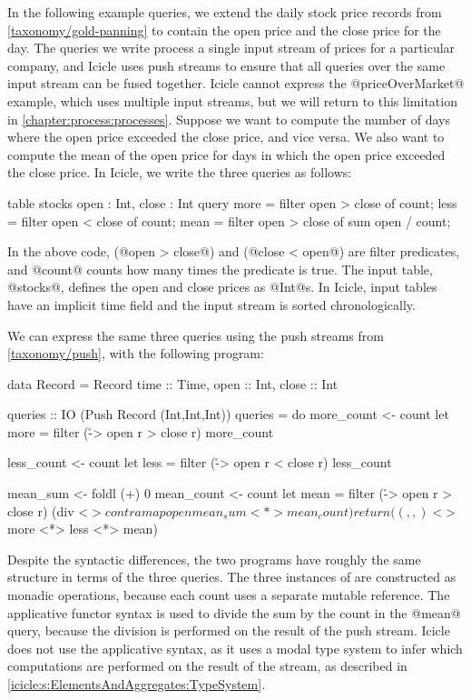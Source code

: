 In the following example queries, we extend the daily stock price records from \cref{taxonomy/gold-panning} to contain the open price and the close price for the day.
The queries we write process a single input stream of prices for a particular company, and Icicle uses push streams to ensure that all queries over the same input stream can be fused together.
Icicle cannot express the @priceOverMarket@ example, which uses multiple input streams, but we will return to this limitation in \cref{chapter:process:processes}.
Suppose we want to compute the number of days where the open price exceeded the close price, and vice versa.
We also want to compute the mean of the open price for days in which the open price exceeded the close price.
In Icicle, we write the three queries as follows:

\begin{icicle}
table stocks { open : Int, close : Int }
query 
  more = filter open > close of count;
  less = filter open < close of count;
  mean = filter open > close of sum open / count;
\end{icicle}

In the above code, (@open > close@) and (@close < open@) are filter predicates, and @count@ counts how many times the predicate is true.
The input table, @stocks@, defines the open and close prices as @Int@s.
In Icicle, input tables have an implicit time field and the input stream is sorted chronologically.

We can express the same three queries using the push streams from \cref{taxonomy/push}, with the following program:

\begin{haskell}
data Record = Record
 { time :: Time, open :: Int, close :: Int }

queries :: IO (Push Record (Int,Int,Int))
queries = do
  more_count <- count
  let more = filter (\r -> open r > close r) more_count

  less_count <- count
  let less = filter (\r -> open r < close r) less_count

  mean_sum   <- foldl (+) 0
  mean_count <- count
  let mean = filter (\r -> open r > close r)
                    (div <$> contramap open mean_sum <*> mean_count)
  return ((,,) <$> more <*> less <*> mean)
\end{haskell}

Despite the syntactic differences, the two programs have roughly the same structure in terms of the three queries.
The three instances of \Hs@count@ are constructed as monadic \Hs@IO@ operations, because each count uses a separate mutable reference.
The applicative functor syntax is used to divide the sum by the count in the @mean@ query, because the division is performed on the result of the push stream.
Icicle does not use the applicative syntax, as it uses a modal type system to infer which computations are performed on the result of the stream, as described in \cref{icicle:s:ElementsAndAggregates:TypeSystem}.

